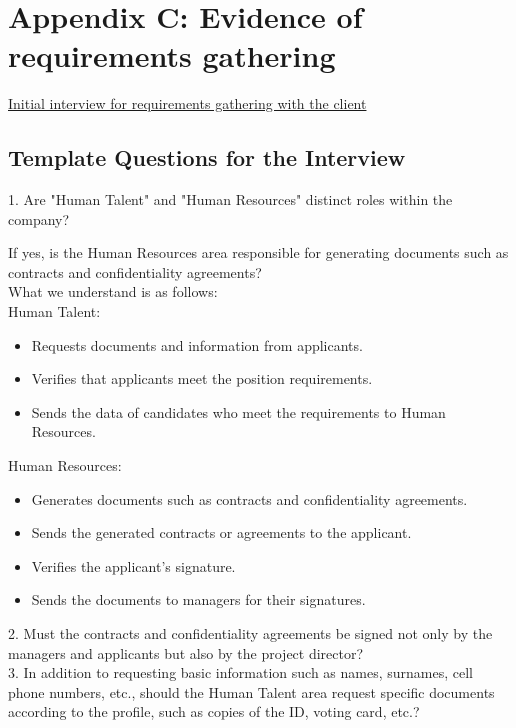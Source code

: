 \documentclass{scrreprt}
\begin{document}
\section{Appendix C: Evidence of requirements gathering}
\href{https://drive.google.com/file/d/1h30RbdVEBx5Qlg8GVXav69ps1Y7cQVRv/view?usp=drive_link}{Initial interview for requirements gathering with the client}
\subsection*{Template Questions for the Interview}

1. Are "Human Talent" and "Human Resources" distinct roles within the company?

    If yes, is the Human Resources area responsible for generating documents such as contracts and confidentiality agreements?\\

    What we understand is as follows:\\
    Human Talent:
    \begin{itemize}
        \item Requests documents and information from applicants.
        \item Verifies that applicants meet the position requirements.
        \item Sends the data of candidates who meet the requirements to Human Resources.
    \end{itemize}
    Human Resources:
    \begin{itemize}
        \item Generates documents such as contracts and confidentiality agreements.
        \item Sends the generated contracts or agreements to the applicant.
        \item Verifies the applicant's signature.
        \item Sends the documents to managers for their signatures.
    \end{itemize}

2. Must the contracts and confidentiality agreements be signed not only by the managers and applicants but also by the project director?\\

3. In addition to requesting basic information such as names, surnames, cell phone numbers, etc., should the Human Talent area request specific documents according to the profile, such as copies of the ID, voting card, etc.?\\
\end{document}

